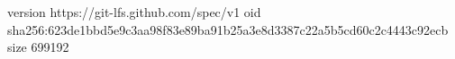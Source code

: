version https://git-lfs.github.com/spec/v1
oid sha256:623de1bbd5e9c3aa98f83e89ba91b25a3e8d3387c22a5b5cd60c2c4443c92ecb
size 699192
